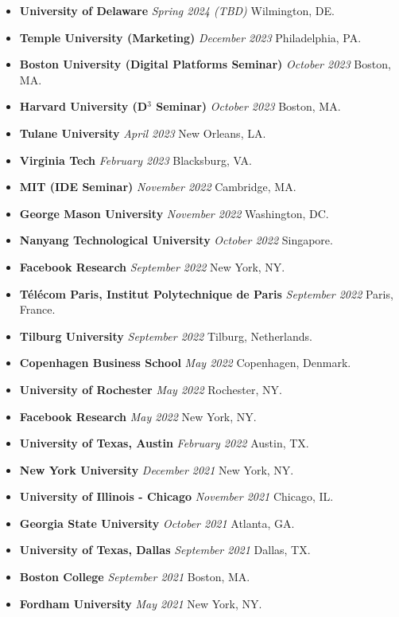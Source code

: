 \documentclass[10.5pt,letterpaper,sans]{moderncv}        %
\begin{document}
\begin{itemize}
\item \textbf{University of Delaware} \textit{Spring 2024 (TBD)} Wilmington, DE.
\item \textbf{Temple University (Marketing)} \textit{December 2023} Philadelphia, PA.
\item \textbf{Boston University (Digital Platforms Seminar)} \textit{October 2023} Boston, MA.
\item \textbf{Harvard University (D$^3$ Seminar)} \textit{October 2023} Boston, MA.
\item \textbf{Tulane University} \textit{April 2023} New Orleans, LA.
\item \textbf{Virginia Tech} \textit{February 2023} Blacksburg, VA.
\item \textbf{MIT (IDE Seminar)} \textit{November 2022} Cambridge, MA.
\item \textbf{George Mason University} \textit{November 2022} Washington, DC.
\item \textbf{Nanyang Technological University} \textit{October 2022} Singapore.
\item \textbf{Facebook Research} \textit{September 2022} New York, NY.
\item \textbf{T\'el\'ecom Paris, Institut Polytechnique de Paris} \textit{September 2022} Paris, France.
\item \textbf{Tilburg University} \textit{September 2022} Tilburg, Netherlands.
\item \textbf{Copenhagen Business School} \textit{May 2022} Copenhagen, Denmark.
\item \textbf{University of Rochester} \textit{May 2022} Rochester, NY.
\item \textbf{Facebook Research} \textit{May 2022} New York, NY.
\item \textbf{University of Texas, Austin} \textit{February 2022} Austin, TX.
\item \textbf{New York University} \textit{December 2021} New York, NY.
\item \textbf{University of Illinois - Chicago} \textit{November 2021} Chicago, IL.
\item \textbf{Georgia State University} \textit{October 2021} Atlanta, GA.
\item \textbf{University of Texas, Dallas} \textit{September 2021} Dallas, TX.
\item \textbf{Boston College} \textit{September 2021} Boston, MA.
\item \textbf{Fordham University} \textit{May 2021} New York, NY.

\end{itemize}
\end{document}
